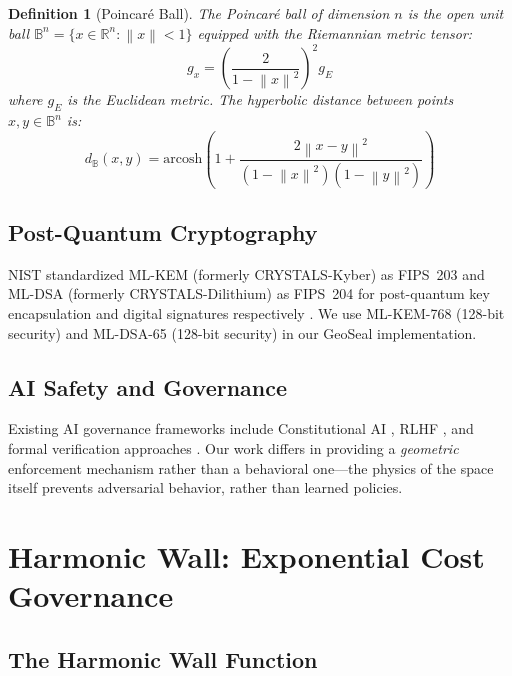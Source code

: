 \documentclass[11pt,a4paper]{article}
\newtheorem{definition}[theorem]{Definition}
\newcommand{\BB}{\mathbb{B}}
\newcommand{\RR}{\mathbb{R}}
\newcommand{\norm}[1]{\left\|#1\right\|}
\begin{document}
\begin{definition}[Poincar\'{e} Ball]
The Poincar\'{e} ball of dimension $n$ is the open unit ball
$\BB^n = \{x \in \RR^n : \norm{x} < 1\}$ equipped with the
Riemannian metric tensor:
\begin{equation}
  g_x = \left(\frac{2}{1 - \norm{x}^2}\right)^2 g_E
\end{equation}
where $g_E$ is the Euclidean metric. The hyperbolic distance between
points $x, y \in \BB^n$ is:
\begin{equation}
  d_{\BB}(x, y) = \text{arcosh}\left(1 + \frac{2\norm{x - y}^2}{(1 - \norm{x}^2)(1 - \norm{y}^2)}\right)
  \label{eq:hyperbolic-dist}
\end{equation}
\end{definition}

\subsection{Post-Quantum Cryptography}

NIST standardized ML-KEM (formerly CRYSTALS-Kyber) as FIPS~203 and
ML-DSA (formerly CRYSTALS-Dilithium) as FIPS~204 for post-quantum
key encapsulation and digital signatures respectively
\cite{nist2024fips203, nist2024fips204}. We use ML-KEM-768
(128-bit security) and ML-DSA-65 (128-bit security) in our
GeoSeal implementation.

\subsection{AI Safety and Governance}

Existing AI governance frameworks include Constitutional AI
\cite{bai2022constitutional}, RLHF \cite{christiano2017deep},
and formal verification approaches \cite{amodei2016concrete}.
Our work differs in providing a \emph{geometric} enforcement
mechanism rather than a behavioral one---the physics of the
space itself prevents adversarial behavior, rather than learned
policies.

\section{Harmonic Wall: Exponential Cost Governance}
\label{sec:harmonic}

\subsection{The Harmonic Wall Function}
\end{document}
